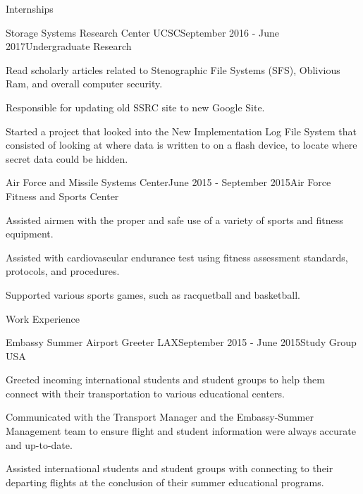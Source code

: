 \documentclass{resume} %
\begin{document}
\begin{rSection}{Internships}

\begin{rSubsection}{Storage Systems Research Center UCSC}{September 2016 - June 2017}{Undergraduate Research}{}
\item Read scholarly articles related to Stenographic File Systems (SFS), Oblivious Ram, and overall computer security.
\item Responsible for updating old SSRC site to new Google Site.
\item Started a project that looked into the New Implementation Log File System that consisted of looking at where data is written to on a flash device, to locate where secret data could be hidden.
\end{rSubsection}



\begin{rSubsection}{Air Force and Missile Systems Center}{June 2015 - September 2015}{Air Force Fitness and Sports Center}{}
\item Assisted airmen with the proper and safe use of a variety of sports and fitness equipment. 
\item Assisted with cardiovascular endurance test using fitness assessment standards, protocols, and procedures.
\item Supported various sports games, such as racquetball and basketball.
\end{rSubsection}

\end{rSection}



\begin{rSection}{Work Experience} \itemsep -2pt
\begin{rSubsection}{Embassy Summer Airport Greeter LAX}{September 2015 - June 2015}{Study Group USA}{}
\item Greeted incoming international students and student groups to help them connect with their transportation to various educational centers.
\item Communicated with the Transport Manager and the Embassy-Summer Management team to ensure flight and student information were always accurate and up-to-date.
\item Assisted international students and student groups with connecting to their departing flights at the conclusion of their summer educational programs.
\end{rSubsection}
  
\end{rSection}
\end{document}
